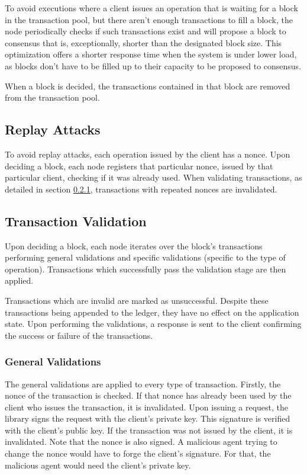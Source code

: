 \documentclass[letterpaper,twocolumn,10pt]{article}
\begin{document}
To avoid executions where a client issues an operation that is waiting for a block in the transaction pool, but there aren't enough transactions to fill a block, the node periodically checks if such transactions exist and will propose a block to consensus that is, exceptionally, shorter than the designated block size. This optimization offers a shorter response time when the system is under lower load, as blocks don't have to be filled up to their capacity to be proposed to consensus.

When a block is decided, the transactions contained in that block are removed from the transaction pool.

\subsection{Replay Attacks}

To avoid replay attacks, each operation issued by the client has a nonce. Upon deciding a block, each node registers that particular nonce, issued by that particular client, checking if it was already used. When validating transactions, as detailed in section \ref{validation}, transactions with repeated nonces are invalidated.

\subsection{Transaction Validation}

Upon deciding a block, each node iterates over the block's transactions performing general validations and specific validations (specific to the type of operation). Transactions which successfully pass the validation stage are then applied.

Transactions which are invalid are marked as unsuccessful. Despite these transactions being appended to the ledger, they have no effect on the application state. Upon performing the validations, a response is sent to the client confirming the success or failure of the transactions.

\subsubsection{General Validations}
\label{validation}

The general validations are applied to every type of transaction. Firstly, the nonce of the transaction is checked. If that nonce has already been used by the client who issues the transaction, it is invalidated. Upon issuing a request, the library signs the request with the client's private key. This signature is verified with the client's public key. If the transaction was not issued by the client, it is invalidated. Note that the nonce is also signed. A malicious agent trying to change the nonce would have to forge the client's signature. For that, the malicious agent would need the client's private key.
\end{document}
